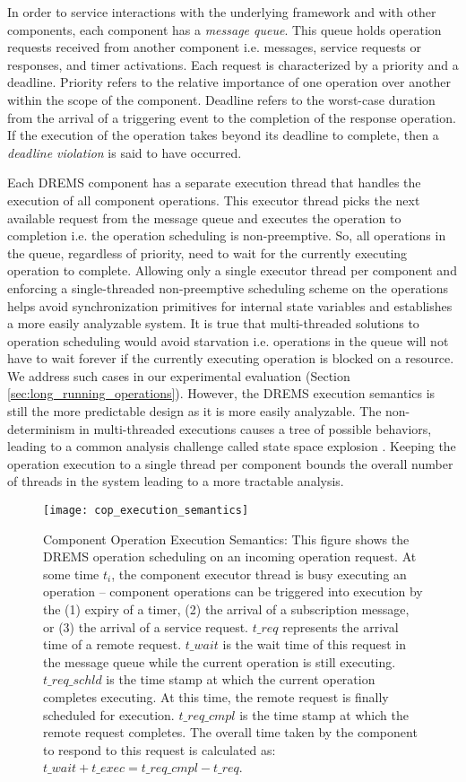In order to service interactions with the underlying framework and with other components, each component has a \emph{message queue}. This queue holds operation requests received from another component i.e. messages, service requests or responses, and timer activations. Each request is characterized by a priority and a deadline. Priority refers to the relative importance of one operation over another within the scope of the component. Deadline refers to the worst-case duration from the arrival of a triggering event to the completion of the response operation. If the execution of the operation takes beyond its deadline to complete, then a \emph{deadline violation} is said to have occurred. 

Each DREMS component has a separate execution thread that handles the execution of all component operations. This executor thread picks the next available request from the message queue and executes the operation to completion i.e. the operation scheduling is non-preemptive. So, all operations in the queue, regardless of priority, need to wait for the currently executing operation to complete. Allowing only a single executor thread per component and enforcing a single-threaded non-preemptive scheduling scheme on the operations helps avoid synchronization primitives for internal state variables and establishes a more easily analyzable system. It is true that multi-threaded solutions to operation scheduling would avoid starvation i.e. operations in the queue will not have to wait forever if the currently executing operation is blocked on a resource. We address such cases in our experimental evaluation (Section \ref{sec:long_running_operations}). However, the DREMS execution semantics is still the more predictable design as it is more easily analyzable. The non-determinism in multi-threaded executions causes a tree of possible behaviors, leading to a common analysis challenge called state space explosion \cite{lin1987protocol}. Keeping the operation execution to a single thread per component bounds the overall number of threads in the system leading to a more tractable analysis. 

\begin{figure}[ht]
	\centering
	\texttt{[image: cop\_execution\_semantics]}
	\caption{Component Operation Execution Semantics: This figure shows the DREMS operation scheduling on an incoming operation request. At some time $t_{i}$, the component executor thread is busy executing an operation -- component operations can be triggered into execution by the (1) expiry of a timer, (2) the arrival of a subscription message, or (3) the arrival of a service request. $t\_{req}$ represents the arrival time of a remote request. $t\_{wait}$ is the wait time of this request in the message queue while the current operation is still executing. $t\_{req\_schld}$ is the time stamp at which the current operation completes executing. At this time, the remote request is finally scheduled for execution. $t\_{req\_cmpl}$ is the time stamp at which the remote request completes. The overall time taken by the component to respond to this request is calculated as: $t\_{wait} + t\_{exec} = t\_{req\_cmpl} - t\_{req}$.}
	\label{fig:cop_execution_semantics}
\end{figure}

